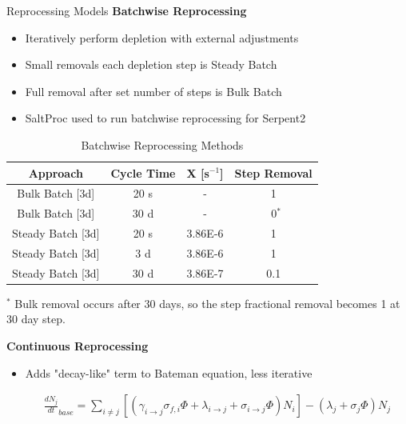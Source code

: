 \documentclass[final]{beamer}
\newlength{\onecolwid}
\newlength{\threecolwid}
\begin{document}
\begin{frame}[t]
\begin{columns}[t,totalwidth=\threecolwid]
\begin{column}{\onecolwid}
\begin{block}{Reprocessing Models}
\vspace{0.7em}
\textbf{Batchwise Reprocessing}

\begin{itemize}
        \item Iteratively perform depletion with external adjustments
	\item Small removals each depletion step is Steady Batch
	\item Full removal after set number of steps is Bulk Batch
	\item SaltProc used to run batchwise reprocessing for Serpent2
\end{itemize}


\begin{table}[H]
\renewcommand{\arraystretch}{1.25}
\caption{Batchwise Reprocessing Methods}
\label{tab:batch_methods}
\begin{center}
\begin{tabular}{ | c | c | c | c | }
 \hline
	Approach & Cycle Time & X [s$^{-1}$] & Step Removal\\
 \hline
 \hline
	Bulk Batch [3d] & 20 s & - & 1\\
	Bulk Batch [3d] & 30 d & - & \, 0$^{*}$ \\
	Steady Batch [3d] & 20 s & 3.86E-6 & 1\\
	Steady Batch [3d] & 3 d & 3.86E-6 & 1\\
	Steady Batch [3d] & 30 d & 3.86E-7 & 0.1\\
 \hline
\end{tabular}
\end{center}
\end{table}
	\begin{center}
\footnotesize{$^{*}$ Bulk removal occurs after 30 days, so the step fractional removal becomes 1 at 30 day step.}\\
	\end{center}

\vspace{0.7em}
\textbf{Continuous Reprocessing}

\begin{itemize}
	\item Adds "decay-like" term to Bateman equation, less iterative \cite{aufiero_extended_2013}

\begin{align*}
\frac{dN_j}{dt}_{base} = \sum_{i \neq j}  \left [ \left( \gamma_{i \rightarrow j} \sigma_{f, i} \Phi + \lambda _{i \rightarrow j} + \sigma_{i \rightarrow j} \Phi \right) N_i \right ] - \left ( \lambda_j + \sigma_j \Phi \right ) N_j
\end{align*}


\end{itemize}
\end{block}
\end{column}
\end{columns}
\end{frame}
\end{document}
